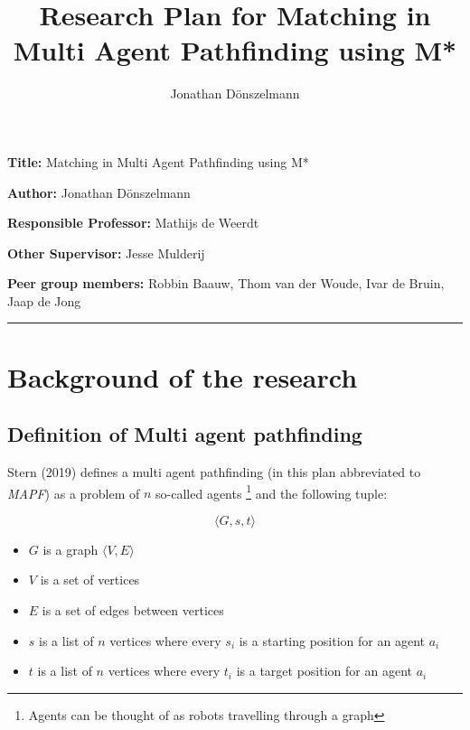 \documentclass[english]{article}
\title{Research Plan for Matching in Multi Agent Pathfinding using M*}
\author{Jonathan Dönszelmann}
\newcommand{\namelistlabel}[1]{\mbox{#1}\hfil}
\newenvironment{namelist}[1]{%
\begin{list}{}
    {
        \let\makelabel\namelistlabel
        \settowidth{\labelwidth}{#1}
        \setlength{\leftmargin}{1.1\labelwidth}
    }
  }{
\end{list}}
\begin{document}
\maketitle

\begin{namelist}{xxxxxxxxxxxxxxxxxxxxxxxxxxxxxxxxxxxxxxx}
\item[{\bf Title:}]
	Matching in Multi Agent Pathfinding using M*
\item[{\bf Author:}]
	Jonathan Dönszelmann
\item[{\bf Responsible Professor:}]
	Mathijs de Weerdt
\item[{\bf Other Supervisor:}]
	Jesse Mulderij
\item[{\bf Peer group members:}]
	Robbin Baauw, Thom van der Woude, Ivar de Bruin, Jaap de Jong
\end{namelist}

\tableofcontents
\noindent\rule{\textwidth}{1pt}

\section{Background of the research}

\subsection{Definition of Multi agent pathfinding}
Stern (2019) \cite{mapf_definition_stern_2019} defines a multi agent pathfinding (in this plan abbreviated to \textit{MAPF}) as a problem of $n$ so-called agents \footnote{Agents can be thought of as robots travelling through a graph} and the following tuple:

$$
\langle G, s, t \rangle
$$

\begin{itemize}
    \item $G$ is a graph $\langle V, E \rangle$ 
    \item $V$ is a set of vertices
    \item $E$ is a set of edges between vertices
    \item $s$ is a list of $n$ vertices where every $s_i$ is a starting position for an agent $a_i$
    \item $t$ is a list of $n$ vertices where every $t_i$ is a target position for an agent $a_i$
\end{itemize}
\end{document}
